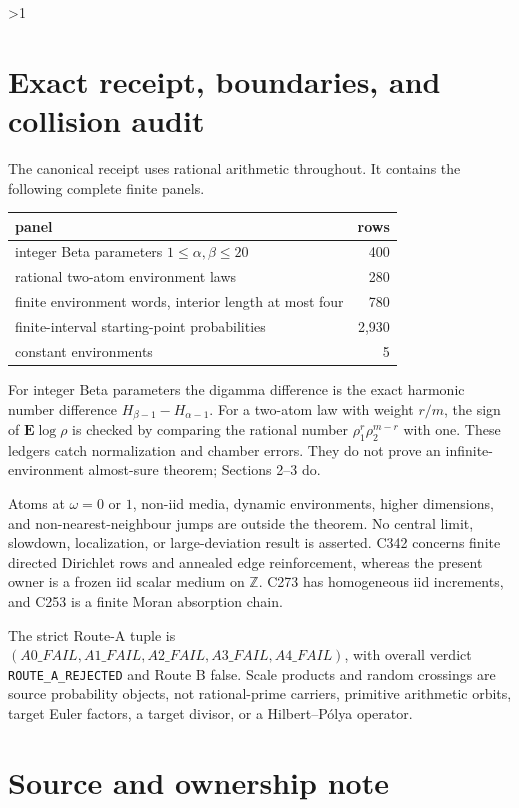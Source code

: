 \documentclass[10pt]{article}
\providecommand{\CRevisionRound}{2}
\theoremstyle{remark}
\newcommand{\EE}{\mathbf E}
\begin{document}
\ifnum\CRevisionRound>1
\section{Exact receipt, boundaries, and collision audit}

The canonical receipt uses rational arithmetic throughout.  It contains the
following complete finite panels.
\begin{center}
\begin{tabular}{lr}
\toprule
panel & rows\\
\midrule
integer Beta parameters \(1\leq\alpha,\beta\leq20\) & 400\\
rational two-atom environment laws & 280\\
finite environment words, interior length at most four & 780\\
finite-interval starting-point probabilities & 2,930\\
constant environments & 5\\
\bottomrule
\end{tabular}
\end{center}
For integer Beta parameters the digamma difference is the exact harmonic
number difference \(H_{\beta-1}-H_{\alpha-1}\).  For a two-atom law with
weight \(r/m\), the sign of \(\EE\log\rho\) is checked by comparing the
rational number \(\rho_1^r\rho_2^{m-r}\) with one.  These ledgers catch
normalization and chamber errors.  They do not prove an infinite-environment
almost-sure theorem; Sections 2--3 do.

Atoms at \(\omega=0\) or \(1\), non-iid media, dynamic environments,
higher dimensions, and non-nearest-neighbour jumps are outside the theorem.
No central limit, slowdown, localization, or large-deviation result is
asserted.  C342 concerns finite directed Dirichlet rows and annealed edge
reinforcement, whereas the present owner is a frozen iid scalar medium on
\(\mathbb Z\).  C273 has homogeneous iid increments, and C253 is a finite
Moran absorption chain.

The strict Route-A tuple is
\((A0\_FAIL,A1\_FAIL,A2\_FAIL,A3\_FAIL,A4\_FAIL)\), with overall verdict
\texttt{ROUTE\_A\_REJECTED} and Route B false.  Scale products and random
crossings are source probability objects, not rational-prime carriers,
primitive arithmetic orbits, target Euler factors, a target divisor, or a
Hilbert--P\'olya operator.
\fi

\section{Source and ownership note}
\end{document}
